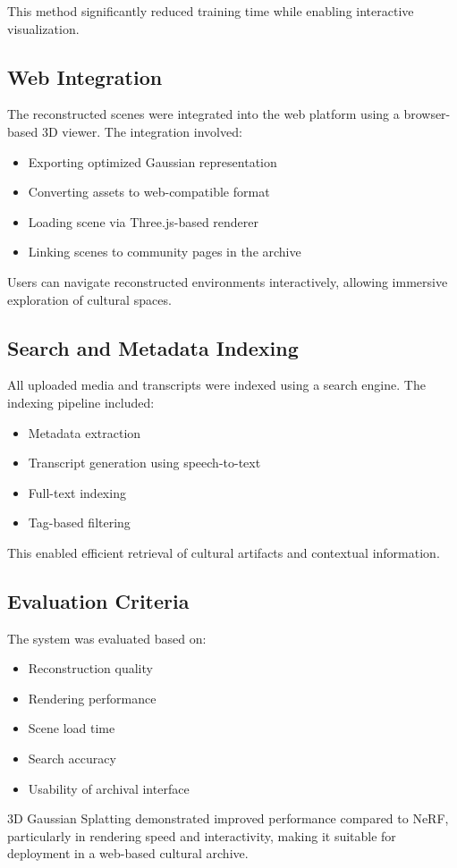 This method significantly reduced training time while enabling interactive visualization.

\subsection{Web Integration}

The reconstructed scenes were integrated into the web platform using a browser-based 3D viewer. The integration involved:

\begin{itemize}
    \item Exporting optimized Gaussian representation
    \item Converting assets to web-compatible format
    \item Loading scene via Three.js-based renderer
    \item Linking scenes to community pages in the archive
\end{itemize}

Users can navigate reconstructed environments interactively, allowing immersive exploration of cultural spaces.

\subsection{Search and Metadata Indexing}

All uploaded media and transcripts were indexed using a search engine. The indexing pipeline included:

\begin{itemize}
    \item Metadata extraction
    \item Transcript generation using speech-to-text
    \item Full-text indexing
    \item Tag-based filtering
\end{itemize}

This enabled efficient retrieval of cultural artifacts and contextual information.

\subsection{Evaluation Criteria}

The system was evaluated based on:

\begin{itemize}
    \item Reconstruction quality
    \item Rendering performance
    \item Scene load time
    \item Search accuracy
    \item Usability of archival interface
\end{itemize}

3D Gaussian Splatting demonstrated improved performance compared to NeRF, particularly in rendering speed and interactivity, making it suitable for deployment in a web-based cultural archive.